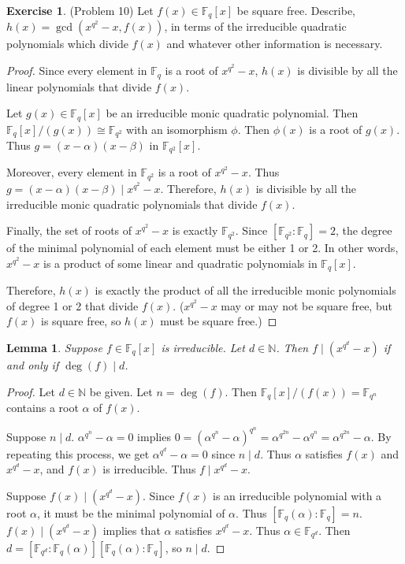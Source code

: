 \documentclass[12pt, psamsfonts]{amsart}
\newtheorem{lem}[thm]{Lemma}
\theoremstyle{definition}
\newtheorem*{exer}{Exercise}
\theoremstyle{remark}
\numberwithin{equation}{section}
\begin{document}
\begin{exer}{(Problem 10)}
  Let $f(x) \in \mathbb{F}_q[x]$ be square free.
  Describe, $h(x) = \gcd(x^{q^2} - x, f(x))$, in terms of the irreducible quadratic polynomials which divide $f(x)$ and whatever other information is necessary.
\end{exer}

\begin{proof}
  Since every element in $\mathbb{F}_q$ is a root of $x^{q^2} - x$, $h(x)$ is divisible by all the linear polynomials that divide $f(x)$.

  Let $g(x) \in \mathbb{F}_q[x]$ be an irreducible monic quadratic polynomial.
  Then $\mathbb{F}_q[x]/(g(x)) \cong \mathbb{F}_{q^2}$ with an isomorphism $\phi$.
  Then $\phi(x)$ is a root of $g(x)$.
  Thus $g = (x - \alpha)(x - \beta)$ in $\mathbb{F}_{q^2}[x]$.

  Moreover, every element in $\mathbb{F}_{q^2}$ is a root of $x^{q^2} - x$.
  Thus $g = (x - \alpha)(x - \beta) \mid x^{q^2} - x$.
  Therefore, $h(x)$ is divisible by all the irreducible monic quadratic polynomials that divide $f(x)$.

  Finally, the set of roots of $x^{q^2} - x$ is exactly $\mathbb{F}_{q^2}$.
  Since $[\mathbb{F}_{q^2}:\mathbb{F}_q] = 2$, the degree of the minimal polynomial of each element must be either 1 or 2.
  In other words, $x^{q^2} - x$ is a product of some linear and quadratic polynomials in $\mathbb{F}_q[x]$.

  Therefore, $h(x)$ is exactly the product of all the irreducible monic polynomials of degree 1 or 2 that divide $f(x)$.
  ($x^{q^2} - x$ may or may not be square free, but $f(x)$ is square free, so $h(x)$ must be square free.)
\end{proof}

\begin{lem}\label{mylem}
  Suppose $f \in \mathbb{F}_q[x]$ is irreducible.
  Let $d \in \mathbb{N}$.
  Then $f \mid (x^{q^d} - x)$ if and only if $\deg(f) \mid d$.
\end{lem}

\begin{proof}
  Let $d \in \mathbb{N}$ be given.
  Let $n = \deg(f)$.
  Then $\mathbb{F}_q[x]/(f(x)) = \mathbb{F}_{q^n}$ contains a root $\alpha$ of $f(x)$.

  Suppose $n \mid d$.
  $\alpha^{q^n} - \alpha = 0$ implies $0 = (\alpha^{q^n} - \alpha)^{q^n} = \alpha^{q^{2n}} - \alpha^{q^n} = \alpha^{q^{2n}} - \alpha$.
  By repeating this process, we get $\alpha^{q^{d}} - \alpha = 0$ since $n \mid d$.
  Thus $\alpha$ satisfies $f(x)$ and $x^{q^d} - x$, and $f(x)$ is irreducible.
  Thus $f \mid x^{q^d} - x$.

  Suppose $f(x) \mid (x^{q^d} - x)$.
  Since $f(x)$ is an irreducible polynomial with a root $\alpha$, it must be the minimal polynomial of $\alpha$.
  Thus $[\mathbb{F}_q(\alpha):\mathbb{F}_q] = n$.
  $f(x) \mid (x^{q^d} - x)$ implies that $\alpha$ satisfies $x^{q^d} - x$.
  Thus $\alpha \in \mathbb{F}_{q^d}$.
  Then $d = [\mathbb{F}_{q^d}:\mathbb{F}_q(\alpha)][\mathbb{F}_q(\alpha):\mathbb{F}_q]$, so $n \mid d$.
\end{proof}
\end{document}
